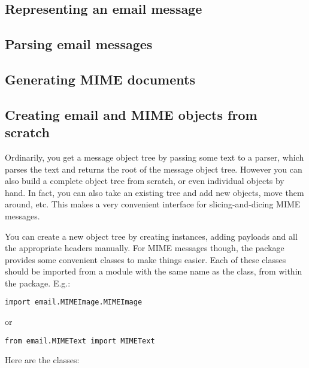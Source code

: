 \subsection{Representing an email message}


\subsection{Parsing email messages}


\subsection{Generating MIME documents}


\subsection{Creating email and MIME objects from scratch}

Ordinarily, you get a message object tree by passing some text to a
parser, which parses the text and returns the root of the message
object tree.  However you can also build a complete object tree from
scratch, or even individual  objects by hand.  In fact,
you can also take an existing tree and add new 
objects, move them around, etc.  This makes a very convenient
interface for slicing-and-dicing MIME messages.

You can create a new object tree by creating 
instances, adding payloads and all the appropriate headers manually.
For MIME messages though, the  package provides some
convenient classes to make things easier.  Each of these classes
should be imported from a module with the same name as the class, from
within the  package.  E.g.:

\begin{verbatim}
import email.MIMEImage.MIMEImage
\end{verbatim}

or

\begin{verbatim}
from email.MIMEText import MIMEText
\end{verbatim}

Here are the classes:

